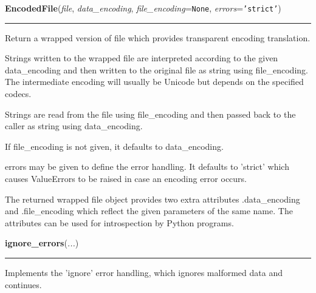 \hspace{.8\funcindent}\begin{boxedminipage}{\funcwidth}

    \raggedright \textbf{EncodedFile}(\textit{file}, \textit{data\_encoding}, \textit{file\_encoding}={\tt None}, \textit{errors}={\tt \texttt{'}\texttt{strict}\texttt{'}})

    \vspace{-1.5ex}

    \rule{\textwidth}{0.5\fboxrule}
\setlength{\parskip}{2ex}
    Return a wrapped version of file which provides transparent encoding 
    translation.

    Strings written to the wrapped file are interpreted according to the 
    given data\_encoding and then written to the original file as string 
    using file\_encoding. The intermediate encoding will usually be Unicode
    but depends on the specified codecs.

    Strings are read from the file using file\_encoding and then passed 
    back to the caller as string using data\_encoding.

    If file\_encoding is not given, it defaults to data\_encoding.

    errors may be given to define the error handling. It defaults to 
    'strict' which causes ValueErrors to be raised in case an encoding 
    error occurs.

    The returned wrapped file object provides two extra attributes 
    .data\_encoding and .file\_encoding which reflect the given parameters 
    of the same name. The attributes can be used for introspection by 
    Python programs.

\setlength{\parskip}{1ex}
    \end{boxedminipage}

    \label{codecs:ignore_errors}

    \vspace{0.5ex}

\hspace{.8\funcindent}\begin{boxedminipage}{\funcwidth}

    \raggedright \textbf{ignore\_errors}(\textit{...})

    \vspace{-1.5ex}

    \rule{\textwidth}{0.5\fboxrule}
\setlength{\parskip}{2ex}
    Implements the 'ignore' error handling, which ignores malformed data 
    and continues.

\setlength{\parskip}{1ex}
    \end{boxedminipage}


